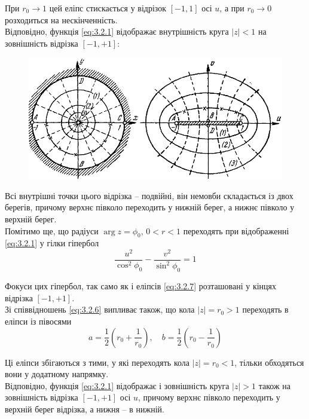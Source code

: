 При $r_0 \to 1$ цей еліпс стискається у відрізок $[-1, 1]$ осі $u$, а при $r_0 \to 0$ розходиться на нескінченність. \\

Відповідно, функція \eqref{eq:3.2.1} відображає внутрішність круга $|z| < 1$ на зовнішність відрізка $[-1, +1]$:
\begin{figure}[H]
	\centering
	\includegraphics[width=.8\linewidth]{mal-11.png}
\end{figure}

Всі внутрішні точки цього відрізка -- подвійні, він немовби складається із двох берегів, причому верхнє півколо переходить у нижній берег, а нижнє півколо у верхній берег. \\

Помітимо ще, що радіуси $\arg z = \phi_0$, $0 < r < 1$ переходять при відображенні \eqref{eq:3.2.1} у гілки гіпербол
\begin{equation}
	\label{eq:3.2.9}
	\dfrac{u^2}{\cos^2 \phi_0} - \dfrac{v^2}{\sin^2 \phi_0} = 1
\end{equation}

Фокуси цих гіпербол, так само як і еліпсів \eqref{eq:3.2.7} розташовані у кінцях відрізка $[-1, +1]$. \\

Зі співвідношень \eqref{eq:3.2.6} випливає також, що кола $|z| = r_0 > 1$ переходять в еліпси із півосями
\begin{equation}
	\label{eq:3.2.10}
	a = \dfrac 12 \left( r_0 + \dfrac{1}{r_0} \right), \quad b = \dfrac 12 \left( r_0 - \dfrac{1}{r_0} \right)
\end{equation}

Ці еліпси збігаються з тими, у які переходять кола $|z| = r_0 < 1$, тільки обходяться вони у додатному напрямку. \\

Відповідно, функція \eqref{eq:3.2.1} відображає і зовнішність круга $|z| > 1$ також на зовнішність відрізка $[-1, +1]$ осі $u$, причому верхнє півколо переходить у верхній берег відрізка, а нижня -- в нижній. \\

